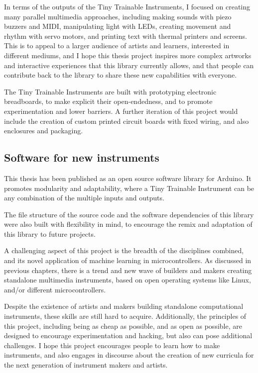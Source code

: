 In terms of the outputs of the Tiny Trainable Instruments, I focused on creating many parallel multimedia approaches, including making sounds with piezo buzzers and MIDI, manipulating light with LEDs, creating movement and rhythm with servo motors, and printing text with thermal printers and screens. This is to appeal to a larger audience of artists and learners, interested in different mediums, and I hope this thesis project inspires more complex artworks and interactive experiences that this library currently allows, and that people can contribute back to the library to share these new capabilities with everyone.

The Tiny Trainable Instruments are built with prototyping electronic breadboards, to make explicit their open-endedness, and to promote experimentation and lower barriers. A further iteration of this project would include the creation of custom printed circuit boards with fixed wiring, and also enclosures and packaging.

\subsection{Software for new instruments}

This thesis has been published as an open source software library for Arduino. It promotes modularity and adaptability, where a Tiny Trainable Instrument can be any combination of the multiple inputs and outputs.

The file structure of the source code and the software dependencies of this library were also built with flexibility in mind, to encourage the remix and adaptation of this library to future projects.

A challenging aspect of this project is the breadth of the disciplines combined, and its novel application of machine learning in microcontrollers. As discussed in previous chapters, there is a trend and new wave of builders and makers creating standalone multimedia instruments, based on open operating systems like Linux, and/or different microcontrollers. 

Despite the existence of artists and makers building standalone computational instruments, these skills are still hard to acquire. Additionally, the principles of this project, including being as cheap as possible, and as open as possible, are designed to encourage experimentation and hacking, but also can pose additional challenges. I hope this project encourages people to learn how to make instruments, and also engages in discourse about the creation of new curricula for the next generation of instrument makers and artists.

